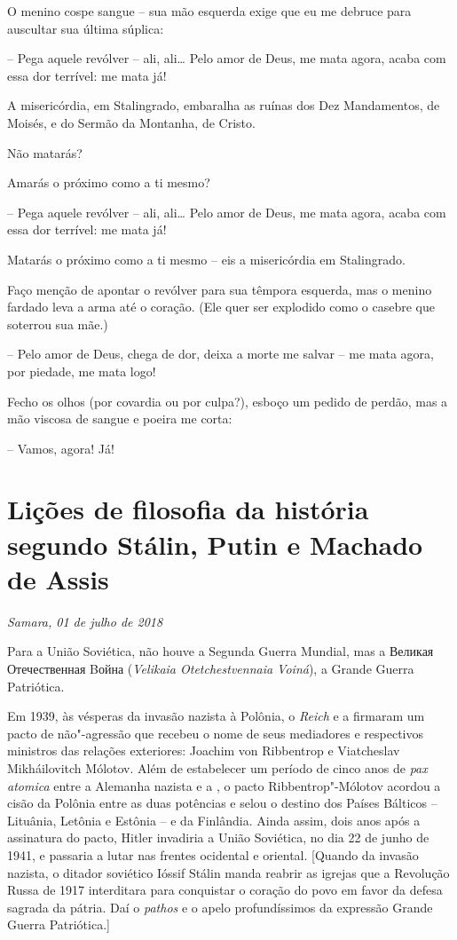 O menino cospe sangue -- sua mão esquerda exige que eu me debruce para
auscultar sua última súplica:

-- Pega aquele revólver -- ali, ali\ldots{} Pelo amor de Deus, me mata agora,
acaba com essa dor terrível: me mata já!

A misericórdia, em Stalingrado, embaralha as ruínas dos Dez Mandamentos,
de Moisés, e do Sermão da Montanha, de Cristo.

Não matarás?

Amarás o próximo como a ti mesmo?

-- Pega aquele revólver -- ali, ali\ldots{} Pelo amor de Deus, me mata agora,
acaba com essa dor terrível: me mata já!

Matarás o próximo como a ti mesmo -- eis a misericórdia em Stalingrado.

Faço menção de apontar o revólver para sua têmpora esquerda, mas o
menino fardado leva a arma até o coração. (Ele quer ser explodido como o
casebre que soterrou sua mãe.)

-- Pelo amor de Deus, chega de dor, deixa a morte me salvar -- me mata
agora, por piedade, me mata logo!

Fecho os olhos (por covardia ou por culpa?), esboço um pedido de perdão,
mas a mão viscosa de sangue e poeira me corta:

-- Vamos, agora! Já!

\chapter*{Lições de filosofia da história segundo Stálin, Putin e Machado de Assis}

\begin{flushright}
\emph{Samara, 01 de julho de 2018}
\end{flushright}

Para a União Soviética, não houve a Segunda Guerra Mundial, mas a
Великая Отечественная Bойна (\emph{Velikaia Otetchestvennaia Voiná}), a
Grande Guerra Patriótica.

Em 1939, às vésperas da invasão nazista à Polônia, o  \emph{Reich} e
a  firmaram um pacto de não"-agressão que recebeu o nome de seus
mediadores e respectivos ministros das relações exteriores: Joachim von
Ribbentrop e Viatcheslav Mikháilovitch Mólotov. Além de estabelecer um
período de cinco anos de \emph{pax atomica} entre a Alemanha nazista e a
, o pacto Ribbentrop"-Mólotov acordou a cisão da Polônia entre as
duas potências e selou o destino dos Países Bálticos -- Lituânia,
Letônia e Estônia -- e da Finlândia. Ainda assim, dois anos após a
assinatura do pacto, Hitler invadiria a União Soviética, no dia 22 de
junho de 1941, e passaria a lutar nas frentes ocidental e oriental.
{[}Quando da invasão nazista, o ditador soviético Ióssif Stálin manda
reabrir as igrejas que a Revolução Russa de 1917 interditara para
conquistar o coração do povo em favor da defesa sagrada da pátria. Daí o
\emph{pathos} e o apelo profundíssimos da expressão Grande Guerra
Patriótica.{]}

